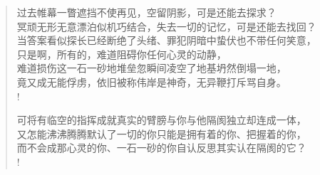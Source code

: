 \documentclass[UTF8, 12pt, a4paper]{ctexrep} %
\begin{document}
\begin{verse}
过去帷幕一瞥遮挡不使再见，空留阴影，可是还能去探求？\\
冥顽无形无意漂泊似机巧结合，失去一切的记忆，可是还能去找回？\\
当答案看似探长已经断绝了头绪、罪犯阴暗中蛰伏也不带任何笑意，\\
只是啊，所有的，难道阻碍你任何心灵的动静，\\
难道损伤这一石一砂地堆垒忽瞬间凌空了地基坍然倒塌一地，\\
竟又成无能俘虏，依旧被称伟岸是神奇，无异鞭打斥骂自身。\\!

可将有临空的指挥成就真实的臂膀与你与他隔阂独立却连成一体，\\
又怎能沸沸腾腾默认了一切的你只能是拥有着的你、把握着的你，\\
而不会成那心灵的你、一石一砂的你自认反思其实认在隔阂的它？\\!

\end{verse}
\end{document}
